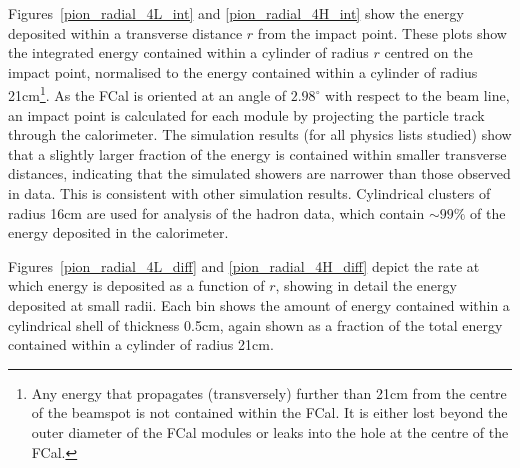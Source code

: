 Figures~\ref{pion_radial_4L_int} and \ref{pion_radial_4H_int} show the energy deposited within a transverse distance $r$ from the impact point. These plots show the integrated energy contained within a cylinder of radius $r$ centred on the impact point, normalised to the energy contained within a cylinder of radius 21cm\footnote{Any energy that propagates (transversely) further than 21cm from the centre of the beamspot is not contained within the FCal. It is either lost beyond the outer diameter of the FCal modules or leaks into the hole at the centre of the FCal.}. As the FCal is oriented at an angle of $2.98^\circ$ with respect to the beam line, an impact point is calculated for each module by projecting the particle track through the calorimeter. The simulation results (for all physics lists studied) show that a slightly larger fraction of the energy is contained within smaller transverse distances, indicating that the simulated showers are narrower than those observed in data. This is consistent with other \atlas simulation results\cite{CTB_localHadCal,calpub2010}. Cylindrical clusters of radius 16cm are used for analysis of the hadron data, which contain $\sim 99\%$ of the energy deposited in the calorimeter. 

Figures~\ref{pion_radial_4L_diff} and \ref{pion_radial_4H_diff} depict the rate at which energy is deposited as a function of $r$, showing in detail the energy deposited at small radii. Each bin shows the amount of energy contained within a cylindrical shell of thickness 0.5cm, again shown as a fraction of the total energy contained within a cylinder of radius 21cm. 


